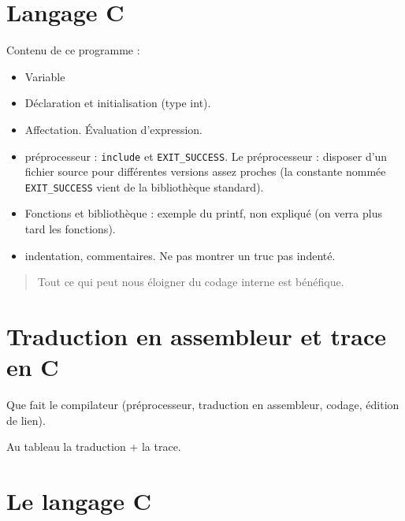 \documentclass[12pt,a4paper]{article}
\begin{document}
\section{Langage C}

Contenu de ce programme :
\begin{itemize}
\item Variable
\item Déclaration et initialisation (type int).
\item Affectation. Évaluation d'expression.
\item préprocesseur : \verb|include| et \verb|EXIT_SUCCESS|. Le
  préprocesseur : disposer d'un fichier source pour différentes
  versions assez proches (la constante nommée \verb|EXIT_SUCCESS|
  vient de la bibliothèque standard).
\item Fonctions et bibliothèque : exemple du printf, non expliqué (on
  verra plus tard les fonctions).
\item indentation, commentaires.  Ne pas montrer un truc pas indenté.
\end{itemize}

\begin{quote}
  Tout ce qui peut nous éloigner du codage interne est bénéfique.
\end{quote}

\section{Traduction en assembleur et trace en C}

Que fait le compilateur (préprocesseur, traduction en assembleur,
codage, édition de lien).

Au tableau la traduction + la trace.

\section{Le langage C}
\end{document}
